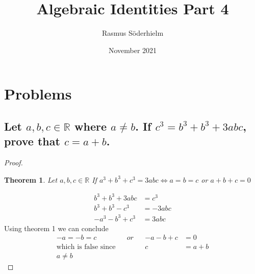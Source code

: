 \documentclass{article}
\title{Algebraic Identities Part 4}
\author{Rasmus Söderhielm}
\date{November 2021}
\newtheorem{theorem}{Theorem}
\begin{document}
\maketitle

\section{Problems}



\subsection{
	\normalfont
	Let $a, b, c \in \mathbb{R} $ where $a \neq b$. If $c^3 = b^3 + b^3 + 3abc$, prove that $c=a+b$.
}

\begin{proof}
	\begin{theorem}
		Let $ a, b, c \in \mathbb{R} $ If $ a^3 + b^3 + c^3 = 3abc \Leftrightarrow a = b = c $ or $ a + b + c = 0 $
	\end{theorem}

	\begin{align*}
		b^3 + b^3 + 3abc & = c^3   \\
		b^3 + b^3 - c^3  & = -3abc \\
		-a^3 - b^3 + c^3 & = 3abc
	\end{align*}
	Using theorem 1 we can conclude
	\begin{align*}
		-a = -b = c                 &  & or &  & -a - b + c & = 0     \\
		\text{which is false since} &  &    &  & c          & = a + b \\
		a \neq b
	\end{align*}
\end{proof}
\end{document}
